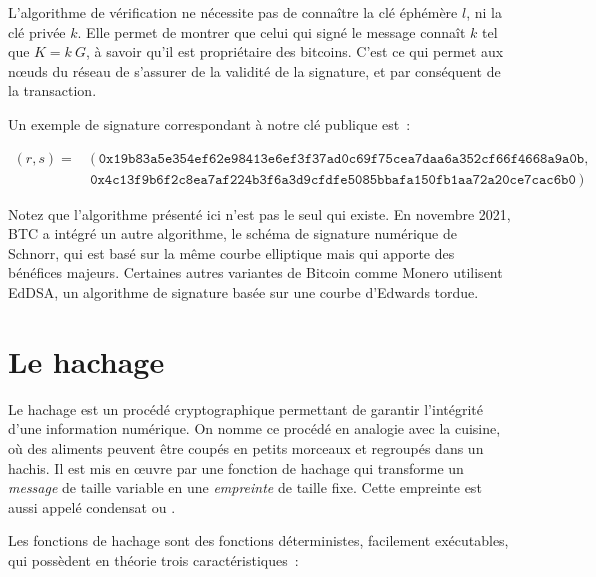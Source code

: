 L'algorithme de vérification ne nécessite pas de connaître la clé éphémère $l$, ni la clé privée $k$. Elle permet de montrer que celui qui signé le message connaît $k$ tel que $K = k~G$, à savoir qu'il est propriétaire des bitcoins. C'est ce qui permet aux nœuds du réseau de s'assurer de la validité de la signature, et par conséquent de la transaction.

Un exemple de signature correspondant à notre clé publique est~:

{ \footnotesize
\begin{align*}
(r, s) = &~(~\mathtt{0x19b83a5e354ef62e98413e6ef3f37ad0c69f75cea7daa6a352cf66f4668a9a0b}, \\
    &~\mathtt{0x4c13f9b6f2c8ea7af224b3f6a3d9cfdfe5085bbafa150fb1aa72a20ce7cac6b0}~)
\end{align*}
}

Notez que l'algorithme présenté ici n'est pas le seul qui existe. En novembre 2021, BTC a intégré un autre algorithme, le schéma de signature numérique de Schnorr, qui est basé sur la même courbe elliptique mais qui apporte des bénéfices majeurs. Certaines autres variantes de Bitcoin comme Monero utilisent EdDSA, un algorithme de signature basée sur une courbe d'Edwards tordue.

\section*{Le hachage} %

Le hachage est un procédé cryptographique permettant de garantir l'intégrité d'une information numérique. On nomme ce procédé en analogie avec la cuisine, où des aliments peuvent être coupés en petits morceaux et regroupés dans un hachis. Il est mis en œuvre par une fonction de hachage qui transforme un \emph{message} de taille variable en une \emph{empreinte} de taille fixe. Cette empreinte est aussi appelé condensat ou .

Les fonctions de hachage sont des fonctions déterministes, facilement exécutables, qui possèdent en théorie trois caractéristiques~:

